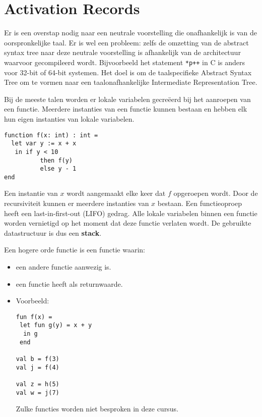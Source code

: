 \chapter{Activation Records}
Er is een overstap nodig naar een neutrale voorstelling die onafhankelijk is van de oorspronkelijke taal. Er is wel een probleem: zelfs de omzetting van de abstract syntax tree naar deze neutrale voorstelling is afhankelijk van de architectuur waarvoor gecompileerd wordt. Bijvoorbeeld het statement \texttt{*p++} in C is anders voor 32-bit of 64-bit systemen. Het doel is om de taalspecifieke Abstract Syntax Tree om te vormen naar een taalonafhankelijke Intermediate Representation Tree.

Bij de meeste talen worden er lokale variabelen gecreëerd bij het aanroepen van een functie. Meerdere instanties van een functie kunnen bestaan en hebben elk hun eigen instanties van lokale variabelen.
\begin{lstlisting}
function f(x: int) : int =
  let var y := x + x
   in if y < 10
          then f(y)
          else y - 1
end
\end{lstlisting}
Een instantie van $x$ wordt aangemaakt elke keer dat $f$ opgeroepen wordt. Door de recursiviteit kunnen er meerdere instanties van $x$ bestaan. Een functieoproep heeft een last-in-first-out (LIFO) gedrag. Alle lokale variabelen binnen een functie worden vernietigd op het moment dat deze functie verlaten wordt. De gebruikte datastructuur is dus een \textbf{stack}.

Een hogere orde functie is een functie waarin:
\begin{itemize}
	\item een andere functie aanwezig is.
	\item een functie heeft als returnwaarde.
	\item Voorbeeld:
	\begin{lstlisting}
fun f(x) =
 let fun g(y) = x + y
  in g
 end
 
val b = f(3)
val j = f(4)
	
val z = h(5)
val w = j(7)
	\end{lstlisting}
	\good 	Zulke functies worden niet besproken in deze cursus.
\end{itemize}




